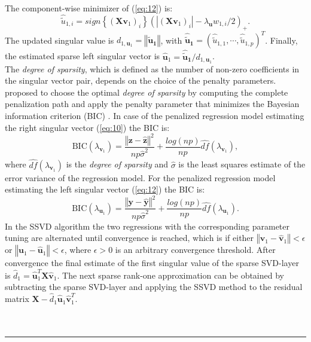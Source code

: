 The component-wise minimizer of (\ref{eq:12}) is:
\begin{equation}
\hat{\tilde{u}}_{1,i}=\textit{sign}\left\{(\mathbf{X}\mathbf{v}_{1})_{i}\right\}(|(\mathbf{X}\mathbf{v}_{1})_{i}|-\lambda_{\mathbf{u}}w_{1,i}/2)_{+}.
\end{equation}
The updated singular value is $d_{1,\mathbf{u}_{1}}=\left\Vert\mathbf{\tilde{u}_{1}}\right\Vert$, with $\mathbf{\hat{\tilde{u}}_{1}}=(\hat{\tilde{u}}_{1,1},\cdots,\hat{\tilde{u}}_{1,p})^{T}$. Finally, the estimated sparse left singular vector is $\mathbf{\hat{u}}_{1}=\mathbf{\hat{\tilde{u}}_{1}}/d_{1,\mathbf{u}_{1}}$.\\

The \textit{degree of sparsity}, which is defined as the number of non-zero coefficients in the singular vector pair, depends on the choice of the penalty parameters.
\citet{Lee2010} proposed to choose the optimal \textit{degree of sparsity} by computing the complete penalization path and apply the penalty parameter that minimizes the Bayesian information criterion (BIC) \cite{Schwarz1978}. In case of the penalized regression model estimating the right singular vector (\ref{eq:10}) the BIC is:
\begin{equation}
\text{BIC}(\lambda_{\mathbf{v}_{1}})=\frac{\left\Vert \mathbf{z}- \hat{\mathbf{z}} \right\Vert^{2}}{np\hat{\sigma}^{2}} + \frac{log(np)}{np} \hat{df}(\lambda_{\mathbf{v}_{1}}), 
\end{equation}
where $\hat{df}(\lambda_{\mathbf{v}_{1}})$ is the \textit{degree of sparsity} and $\hat{\sigma}$ is the least squares estimate of the error variance of the regression model. For the penalized regression model estimating the left singular vector (\ref{eq:12}) the BIC is:
\begin{equation}
\text{BIC}(\lambda_{\mathbf{u}_{1}})=\frac{\left\Vert \mathbf{y}- \hat{\mathbf{y}} \right\Vert^{2}}{np\hat{\sigma}^{2}} + \frac{log(np)}{np} \hat{df}(\lambda_{\mathbf{u}_{1}}).
\end{equation}
In the SSVD algorithm the two regressions with the corresponding parameter tuning are alternated until convergence is reached, which is if either $\left\Vert \mathbf{v}_{1} - \mathbf{\hat{v}}_{1}\right\Vert < \epsilon$ or $\left\Vert \mathbf{u}_{1} - \mathbf{\hat{u}}_{1} \right\Vert < \epsilon$, where $\epsilon > 0$ is an arbitrary convergence threshold. After convergence the final estimate of the first singular value of the sparse SVD-layer is $\hat{d}_{1}=\mathbf{\hat{u}}_{1}^{T}\mathbf{X}\mathbf{\hat{v}}_{1}$. The next sparse rank-one approximation can be obtained by subtracting the sparse SVD-layer and applying the SSVD method to the residual matrix $\mathbf{X}-\hat{d}_{1}\mathbf{\hat{u}}_{1}\mathbf{\hat{v}}_{1}^{T}$. \\
\\
\\
\newpage
\hspace{-0.1cm} 
\rule{14.75 cm}{1pt}

